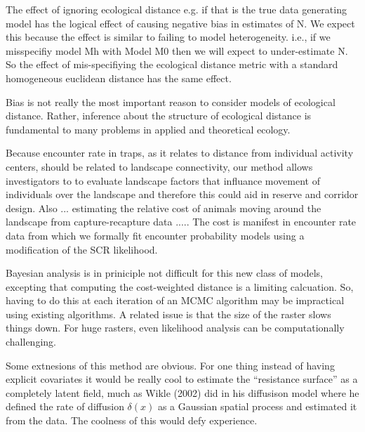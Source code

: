 The effect of ignoring ecological distance e.g. if that is the true
data generating model has the logical effect of causing negative bias
in estimates of N. We expect this because the effect is similar to
failing to model heterogeneity. i.e., if we misspecifiy model Mh with
Model M0 then we will expect to under-estimate N. So the effect of
mis-specifiying the ecological distance metric with a standard
homogeneous euclidean distance has the same effect.

Bias is not really the most important reason to consider models of
ecological distance. Rather, inference about the structure of
ecological distance is fundamental to many problems in applied and
theoretical ecology.

Because encounter rate in traps, as it relates to distance from
individual activity centers, should be related to landscape
connectivity, our method allows investigators to to evaluate landscape
factors that influance movement of individuals over the landscape and
therefore this could aid in reserve and corridor design.  Also ...
estimating the relative cost of animals moving around the landscape
from capture-recapture data ..... The cost is manifest in encounter
rate data from which we formally fit encounter probability models
using a modification of the SCR likelihood.

Bayesian analysis is in priniciple not difficult for this new class of
models, excepting that computing the cost-weighted distance is a
limiting calcuation. So, having to do this at each iteration of an
MCMC algorithm may be impractical using existing algorithms.
A related issue is that the size of the raster slows things down. For
huge rasters, even likelihood analysis can be computationally challenging.

Some extnesions of this method are obvious. For one thing instead of
having explicit covariates it would be really cool to estimate the
``resistance surface'' as a completely latent field, much as Wikle
(2002) did in his diffusison model where he defined the rate of
diffusion $\delta(x)$ as a Gaussian spatial process and estimated it
from the data.  The coolness of this would defy experience. 















